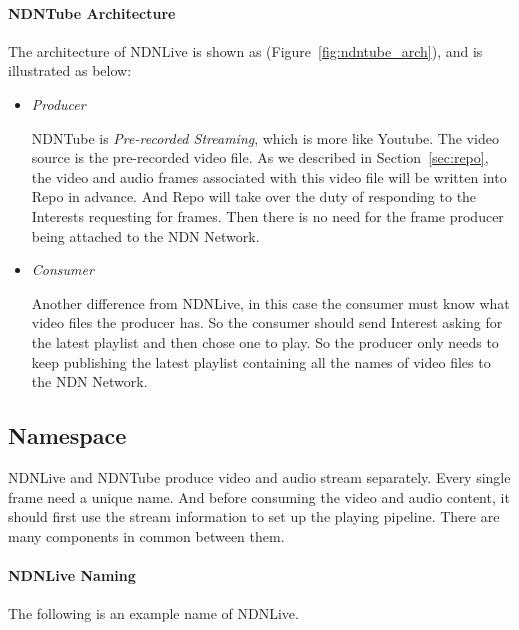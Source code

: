 \paragraph{NDNTube Architecture} %
\vspace{0.3cm}
\label{par:ndntube_arch}
The architecture of NDNLive is shown as (Figure~\ref{fig:ndntube_arch}), and is illustrated as below:
\begin{itemize}
  \item \textit{Producer}

    NDNTube is \textit{Pre-recorded Streaming}, which is more like Youtube. The video source is the pre-recorded video file. As we described in Section~\ref{sec:repo}, the video and audio frames associated with this video file will be written into Repo in advance. And Repo will take over the duty of responding to the Interests requesting for frames. Then there is no need for the frame producer being attached to the NDN Network. 

  \item \textit{Consumer}

    Another difference from NDNLive, in this case the consumer must know what video files the producer has. So the consumer should send Interest asking for the latest playlist and then chose one to play. So the producer only needs to keep publishing the latest playlist containing all the names of video files to the NDN Network.

\end{itemize}


\subsection{Namespace}

NDNLive and NDNTube produce video and audio stream separately. Every single frame need a unique name. And before consuming the video and audio content, it should first use the stream information to set up the playing pipeline. There are many components in common between them. 

\paragraph{NDNLive Naming} %
\label{par:ndnlive_naming}
\vspace{0.3cm}
The following is an example name of NDNLive. 

